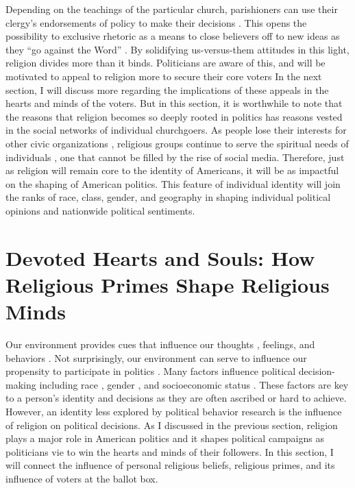 \documentclass[letterpaper,man,natbib,noextraspace,12pt]{apa6}  %
\begin{document}
Depending on the teachings of the particular church, parishioners can use their clergy’s endorsements of policy to make their decisions \citep{brown_race_2016}. This opens the possibility to exclusive rhetoric as a means to close believers off to new ideas as they “go against the Word” \citep{djupe_religious_2013}. By solidifying us-versus-them attitudes in this light, religion divides more than it binds. Politicians are aware of this, and will be motivated to appeal to religion more to secure their core voters \citep{calfano_god_2009, domke_god_2008} In the next section, I will discuss more regarding the implications of these appeals in the hearts and minds of the voters. But in this section, it is worthwhile to note that the reasons that religion becomes so deeply rooted in politics has reasons vested in the social networks of individual churchgoers. As people lose their interests for other civic organizations \citep{putnam_bowling_2001}, religious groups continue to serve the spiritual needs of individuals \citep{putnam_american_2010}, one that cannot be filled by the rise of social media. Therefore, just as religion will remain core to the identity of Americans, it will be as impactful on the shaping of American politics. This feature of individual identity will join the ranks of race, class, gender, and geography in shaping individual political opinions and nationwide political sentiments.

\section{Devoted Hearts and Souls: How Religious Primes Shape Religious Minds}

Our environment provides cues that influence our thoughts \citep{kahneman_thinking_2012}, feelings, and behaviors \citep{cialdini_pre-suasion:_2016}. Not surprisingly, our environment can serve to influence our propensity to participate in politics \citep{barreto_are_2009}. Many factors influence political decision-making \citep{gelman_red_2010} including race \citep{mclaughlin_conditioned_2016}, gender \citep{lawless_it_2005}, and socioeconomic status \citep{gilens2012affluence}. These factors are key to a person’s identity and decisions as they are often ascribed or hard to achieve. However, an identity less explored by political behavior research is the influence of religion on political decisions. As I discussed in the previous section, religion plays a major role in American politics and it shapes political campaigns as politicians vie to win the hearts and minds of their followers. In this section, I will connect the influence of personal religious beliefs, religious primes, and its influence of voters at the ballot box. 
\end{document}
